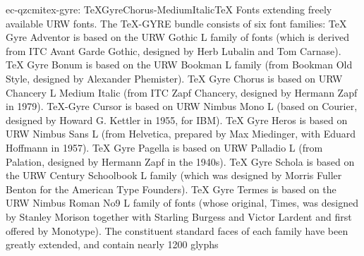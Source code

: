 \documentclass{ddltxtyp}
\begin{document}
\begin{package}{ec-qzcmi}{tex-gyre: TeXGyreChorus-MediumItalic}{{\TeX} Fonts extending freely available URW fonts.}
The {\TeX}-GYRE bundle consists of six font families: {\TeX} Gyre
Adventor is based on the URW Gothic L family of fonts (which is
derived from ITC Avant Garde Gothic, designed by Herb Lubalin
and Tom Carnase). {\TeX} Gyre Bonum is based on the URW Bookman L
family (from Bookman Old Style, designed by Alexander
Phemister). {\TeX} Gyre Chorus is based on URW Chancery L Medium
Italic (from ITC Zapf Chancery, designed by Hermann Zapf in
1979). {\TeX}-Gyre Cursor is based on URW Nimbus Mono L (based on
Courier, designed by Howard G. Kettler in 1955, for IBM). {\TeX}
Gyre Heros is based on URW Nimbus Sans L (from Helvetica,
prepared by Max Miedinger, with Eduard Hoffmann in 1957). {\TeX}
Gyre Pagella is based on URW Palladio L (from Palation,
designed by Hermann Zapf in the 1940s). {\TeX} Gyre Schola is
based on the URW Century Schoolbook L family (which was
designed by Morris Fuller Benton for the American Type
Founders). {\TeX} Gyre Termes is based on the URW Nimbus Roman No9
L family of fonts (whose original, Times, was designed by
Stanley Morison together with Starling Burgess and Victor
Lardent and first offered by Monotype). The constituent
standard faces of each family have been greatly extended, and
contain nearly 1200 glyphs %
\end{package}

\end{document}
